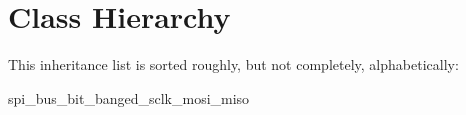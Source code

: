 \section{Class Hierarchy}
This inheritance list is sorted roughly, but not completely, alphabetically\+:\begin{DoxyCompactList}
\item {}
\item spi\+\_\+bus\+\_\+bit\+\_\+banged\+\_\+sclk\+\_\+mosi\+\_\+miso\begin{DoxyCompactList}
\item {}
\end{DoxyCompactList}
\end{DoxyCompactList}
